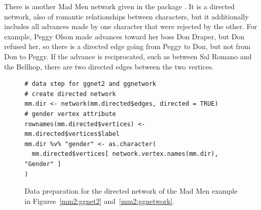  There is another Mad Men network given in the  package \citep{madmen}. It is a directed network, also of romantic relationships between characters, but it additionally includes all advances made by one character that were rejected by the other.  For example, Peggy Olson made advances toward her boss Don Draper, but Don refused her,  so there is a directed edge going from Peggy to Don, but not from Don to Peggy. If the advance is reciprocated, such as between Sal Romano and the Bellhop, there are two directed edges between the two vertices.

\begin{figure}
\begin{knitrout}
\color{fgcolor}\begin{kframe}
\begin{verbatim}
# data step for ggnet2 and ggnetwork
# create directed network
mm.dir <- network(mm.directed$edges, directed = TRUE)
# gender vertex attribute
rownames(mm.directed$vertices) <- mm.directed$vertices$label
mm.dir %v% "gender" <- as.character(
  mm.directed$vertices[ network.vertex.names(mm.dir), "Gender" ]
)
\end{verbatim}
\end{kframe}
\end{knitrout}
\caption{\label{mm2:datastep} Data preparation for the directed network of the  Mad Men example in Figures~\ref{mm2:ggnet2} and~\ref{mm2:ggnetwork}.}

\end{figure}
